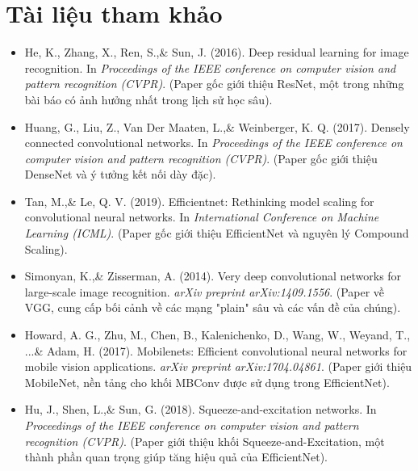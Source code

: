 \section*{Tài liệu tham khảo}
\begin{itemize}
	\item[1] He, K., Zhang, X., Ren, S.,\& Sun, J. (2016). Deep residual learning for image recognition. In \textit{Proceedings of the IEEE conference on computer vision and pattern recognition (CVPR)}. (Paper gốc giới thiệu ResNet, một trong những bài báo có ảnh hưởng nhất trong lịch sử học sâu).
	\item[2] Huang, G., Liu, Z., Van Der Maaten, L.,\& Weinberger, K. Q. (2017). Densely connected convolutional networks. In \textit{Proceedings of the IEEE conference on computer vision and pattern recognition (CVPR)}. (Paper gốc giới thiệu DenseNet và ý tưởng kết nối dày đặc).
	\item[3] Tan, M.,\& Le, Q. V. (2019). Efficientnet: Rethinking model scaling for convolutional neural networks. In \textit{International Conference on Machine Learning (ICML)}. (Paper gốc giới thiệu EfficientNet và nguyên lý Compound Scaling).
	\item[4] Simonyan, K.,\& Zisserman, A. (2014). Very deep convolutional networks for large-scale image recognition. \textit{arXiv preprint arXiv:1409.1556}. (Paper về VGG, cung cấp bối cảnh về các mạng "plain" sâu và các vấn đề của chúng).
	\item[5] Howard, A. G., Zhu, M., Chen, B., Kalenichenko, D., Wang, W., Weyand, T., ...\& Adam, H. (2017). Mobilenets: Efficient convolutional neural networks for mobile vision applications. \textit{arXiv preprint arXiv:1704.04861}. (Paper giới thiệu MobileNet, nền tảng cho khối MBConv được sử dụng trong EfficientNet).
	\item[6] Hu, J., Shen, L.,\& Sun, G. (2018). Squeeze-and-excitation networks. In \textit{Proceedings of the IEEE conference on computer vision and pattern recognition (CVPR)}. (Paper giới thiệu khối Squeeze-and-Excitation, một thành phần quan trọng giúp tăng hiệu quả của EfficientNet).
\end{itemize}